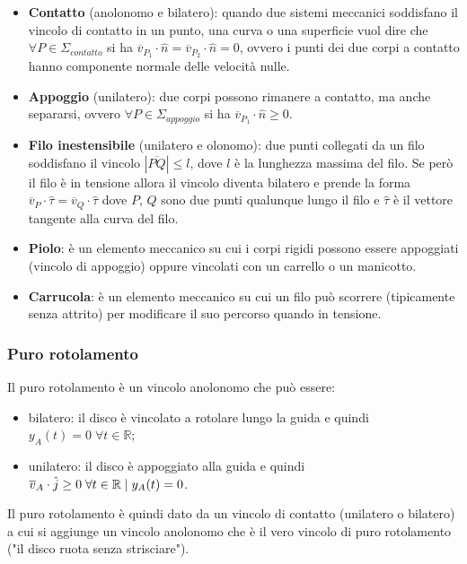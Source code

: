 \documentclass{book}
\theoremstyle{plain}
\theoremstyle{plain}
\theoremstyle{plain}
\theoremstyle{plain}
\theoremstyle{plain}
\theoremstyle{definition}
\theoremstyle{remark}
\theoremstyle{definition}
\begin{document}
\begin{itemize}
    \item \textbf{Contatto} (anolonomo e bilatero): quando due sistemi meccanici soddisfano il vincolo di contatto in un punto, una curva o una superficie vuol dire che $\forall P \in \Sigma_{contatto}$ si ha $\overline{v}_{P_1} \cdot \hat{n}=\overline{v}_{P_2} \cdot \hat{n}=0$, ovvero i punti dei due corpi a contatto hanno componente normale delle velocità nulle.
    \item \textbf{Appoggio} (unilatero): due corpi possono rimanere a contatto, ma anche separarsi, ovvero $\forall P \in \Sigma_{appoggio}$ si ha $\overline{v}_{P_1} \cdot \hat{n} \geq 0$.
    \item \textbf{Filo inestensibile} (unilatero e olonomo): due punti collegati da un filo soddisfano il vincolo $|\overline{PQ}| \leq l$, dove $l$ è la lunghezza massima del filo. Se però il filo è in tensione allora il vincolo diventa bilatero e prende la forma $\overline{v}_{P} \cdot \hat{\tau}=\overline{v}_{Q} \cdot \hat{\tau}$ dove $P$, $Q$ sono due punti qualunque lungo il filo e $\hat{\tau}$ è il vettore tangente alla curva del filo.
    \item \textbf{Piolo}: è un elemento meccanico su cui i corpi rigidi possono essere appoggiati (vincolo di appoggio) oppure vincolati con un carrello o un manicotto.
    \item \textbf{Carrucola}: è un elemento meccanico su cui un filo può scorrere (tipicamente senza attrito) per modificare il suo percorso quando in tensione.
\end{itemize}

\subsubsection{Puro rotolamento}

Il puro rotolamento è un vincolo anolonomo che può essere:

\begin{itemize}
    \item bilatero: il disco è vincolato a rotolare lungo la guida e quindi $y_A(t)=0 \; \forall t \in \mathbb{R}$;
    \item unilatero: il disco è appoggiato alla guida e quindi $\overline{v}_A \cdot \Hat{j} \geq 0 \; \forall t \in \mathbb{R} \; | \; y_A(t)=0$.
\end{itemize}

\noindent Il puro rotolamento è quindi dato da un vincolo di contatto (unilatero o bilatero) a cui si aggiunge un vincolo anolonomo che è il vero vincolo di puro rotolamento ("il disco ruota senza strisciare").
\end{document}
